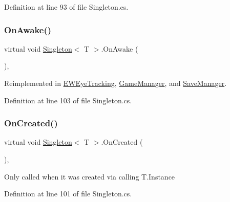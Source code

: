 Definition at line 93 of file Singleton.\+cs.

\mbox{\label{class_singleton_aac558b29781a363c0845b0359c8f85ff}} 
\subsubsection{\texorpdfstring{On\+Awake()}{OnAwake()}}
{\footnotesize\ttfamily virtual void \mbox{\hyperlink{class_singleton}{Singleton}}$<$ T $>$.On\+Awake (\begin{DoxyParamCaption}{ }\end{DoxyParamCaption})\hspace{0.3cm}{\ttfamily [protected]}, {\ttfamily [virtual]}}



Reimplemented in \mbox{\hyperlink{class_e_w_eye_tracking_a0f2a94f353f615f9c10721fd2641bdb6}{E\+W\+Eye\+Tracking}}, \mbox{\hyperlink{class_game_manager_a30d19f2d0dbdc657e6f216a99e4be4af}{Game\+Manager}}, and \mbox{\hyperlink{class_save_manager_a74ded72b7bc7c81cc87722a84518ebcf}{Save\+Manager}}.



Definition at line 103 of file Singleton.\+cs.

\mbox{\label{class_singleton_a2fe04de8c37c320855283a1a1274ea26}} 
\subsubsection{\texorpdfstring{On\+Created()}{OnCreated()}}
{\footnotesize\ttfamily virtual void \mbox{\hyperlink{class_singleton}{Singleton}}$<$ T $>$.On\+Created (\begin{DoxyParamCaption}{ }\end{DoxyParamCaption})\hspace{0.3cm}{\ttfamily [protected]}, {\ttfamily [virtual]}}



Only called when it was created via calling T.\+Instance 



Definition at line 101 of file Singleton.\+cs.

\mbox{\label{class_singleton_a35f0214fbbe0e59abe738b18a2377647}} 
